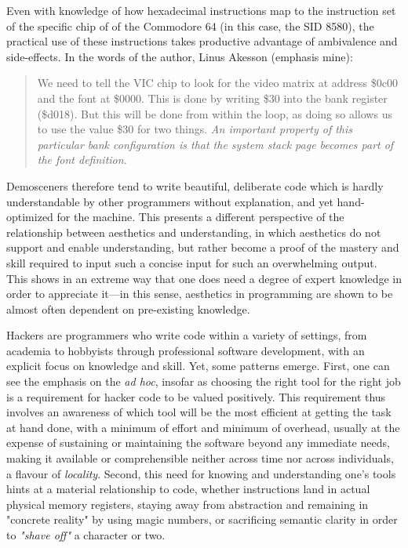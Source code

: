 Even with knowledge of how hexadecimal instructions map to the instruction set of the specific chip of of the Commodore 64 (in this case, the SID 8580), the practical use of these instructions takes productive advantage of ambivalence and side-effects. In the words of the author, Linus Akesson (emphasis mine):

\begin{quote}
  We need to tell the VIC chip to look for the video matrix at address \$0c00 and the font at \$0000. This is done by writing \$30 into the bank register (\$d018). But this will be done from within the loop, as doing so allows us to use the value \$30 for two things. \emph{An important property of this particular bank configuration is that the system stack page becomes part of the font definition}.
\end{quote}

Demosceners therefore tend to write beautiful, deliberate code which is hardly understandable by other programmers without explanation, and yet hand-optimized for the machine. This presents a different perspective of the relationship between aesthetics and understanding, in which aesthetics do not support and enable understanding, but rather become a proof of the mastery and skill required to input such a concise input for such an overwhelming output. This shows in an extreme way that one does need a degree of expert knowledge in order to appreciate it—in this sense, aesthetics in programming are shown to be almost often dependent on pre-existing knowledge.

Hackers are programmers who write code within a variety of settings, from academia to hobbyists through professional software development, with an explicit focus on knowledge and skill. Yet, some patterns emerge. First, one can see the emphasis on the \emph{ad hoc}, insofar as choosing the right tool for the right job is a requirement for hacker code to be valued positively. This requirement thus involves an awareness of which tool will be the most efficient at getting the task at hand done, with a minimum of effort and minimum of overhead, usually at the expense of sustaining or maintaining the software beyond any immediate needs, making it available or comprehensible neither across time nor across individuals, a flavour of \emph{locality}. Second, this need for knowing and understanding one's tools hints at a material relationship to code, whether instructions land in actual physical memory registers, staying away from abstraction and remaining in "concrete reality" by using magic numbers, or sacrificing semantic clarity in order to \emph{"shave off"} a character or two.

